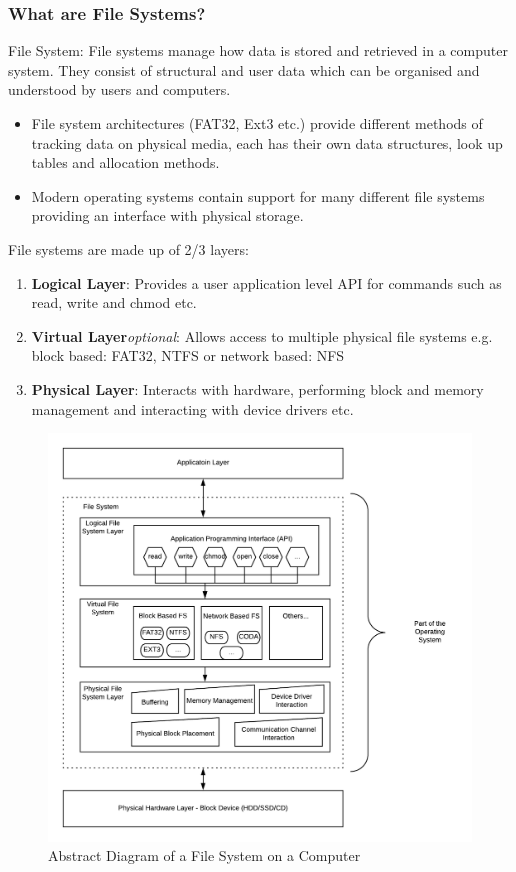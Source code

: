 \documentclass{beamer}
\begin{document}
\begin{frame}[allowframebreaks]
	\frametitle{What are File Systems?}
	\begin{block}{File System:}
		File systems manage how data is stored and retrieved in a computer system. They consist of structural and user data which can be organised and understood by users and computers.
	\end{block}
	
	\begin{itemize}
		\item File system architectures (FAT32, Ext3 etc.) provide different methods of tracking data on physical media, each has their own data structures, look up tables and allocation methods. \\
		
		\item Modern operating systems contain support for many different file systems providing an interface with physical storage. 
	\end{itemize}
	
	\newpage
	File systems are made up of 2/3 layers:
	\begin{enumerate}
		\item\textbf{Logical Layer}: Provides a user application level API for commands such as read, write and chmod etc.
		\item\textbf{Virtual Layer}\textit{optional}: Allows access to multiple physical file systems e.g. block based: FAT32, NTFS or network based: NFS
		\item\textbf{Physical Layer}: Interacts with hardware, performing block and memory management and interacting with device drivers etc.
	\end{enumerate}
	
	\begin{figure}[h]
		\includegraphics[scale=0.5]{abstract-fs-diagram}
		\caption{Abstract Diagram of a File System on a Computer}
		\label{fig:abstract-fs-diagram}	
	\end{figure}
	
\end{frame}
\end{document}
